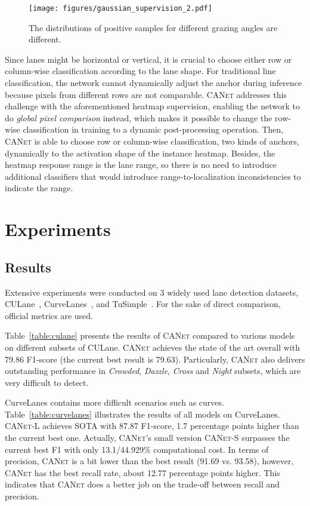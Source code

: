 \documentclass{article}
\newcommand\self{\textsc{CANet}\xspace}
\begin{document}
\begin{figure}
  \centering
  \texttt{[image: figures/gaussian\_supervision\_2.pdf]}
  \caption{The distributions of positive samples for different grazing angles are
    different.}
  \label{fig:gaussian_supervision}
\end{figure}

Since lanes might be horizontal or vertical, it is crucial to choose either row or column-wise classification according to the lane shape. For traditional line classification, the network cannot dynamically adjust the anchor during inference because pixels from different rows are not comparable. \self addresses this challenge with the aforementioned heatmap supervision, enabling the network to do \emph{global pixel comparison} instead, which makes it possible to change the row-wise classification in training to a dynamic post-processing operation. Then, \self is able to choose row or column-wise classification, two kinds of anchors, dynamically to the activation shape of the instance heatmap. 
Besides, the heatmap response range is the lane range, so there is no need to introduce additional classifiers that would introduce range-to-localization inconsistencies to indicate the range.

\section{Experiments}
\label{sec:experiments}



\subsection{Results}
Extensive experiments were conducted on 3 widely used lane detection datasets,
CULane~\cite{scnn}, CurveLanes~\cite{curvelanes}, and TuSimple~\cite{tusimple}.
For the sake of direct comparison, official metrics are used.

Table~\ref{table:culane} presents the results of \self compared to various models on different subsets of CULane. \self achieves the state of the art overall with 79.86 F1-score (the current best result is 79.63). Particularly, \self also delivers outstanding performance in \emph{Crowded}, \emph{Dazzle}, \emph{Cross} and \emph{Night} subsets, which are very difficult to detect. 

CurveLanes contains more difficult scenarios such as curves. Table~\ref{table:curvelanes} illustrates the results of all models on CurveLanes. \self-L achieves SOTA with 87.87 F1-score, 1.7 percentage points higher than the current best one. Actually, \self's small version \self-S surpasses the current best F1 with only 13.1/44.929\% computational cost. In terms of precision, \self is a bit lower than the best result (91.69 vs. 93.58), however, \self has the best recall rate, about 12.77 percentage points higher. This indicates that \self does a better job on the trade-off between recall and precision.
\end{document}
